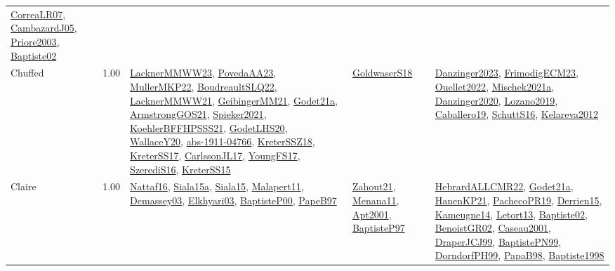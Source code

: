{\begin{longtable}{p{3cm}r>{\raggedright\arraybackslash}p{6cm}>{\raggedright\arraybackslash}p{6cm}>{\raggedright\arraybackslash}p{8cm}}
\hyperref[detail:CorreaLR07]{CorreaLR07}, \hyperref[detail:CambazardJ05]{CambazardJ05}, \hyperref[detail:Priore2003]{Priore2003}, \hyperref[detail:Baptiste02]{Baptiste02}\\
\index{Chuffed}\index{CPSystems!Chuffed}Chuffed &  1.00 & \hyperref[detail:LacknerMMWW23]{LacknerMMWW23}, \hyperref[detail:PovedaAA23]{PovedaAA23}, \hyperref[detail:MullerMKP22]{MullerMKP22}, \hyperref[detail:BoudreaultSLQ22]{BoudreaultSLQ22}, \hyperref[detail:LacknerMMWW21]{LacknerMMWW21}, \hyperref[detail:GeibingerMM21]{GeibingerMM21}, \hyperref[detail:Godet21a]{Godet21a}, \hyperref[detail:ArmstrongGOS21]{ArmstrongGOS21}, \hyperref[detail:Spieker2021]{Spieker2021}, \hyperref[detail:KoehlerBFFHPSSS21]{KoehlerBFFHPSSS21}, \hyperref[detail:GodetLHS20]{GodetLHS20}, \hyperref[detail:WallaceY20]{WallaceY20}, \hyperref[detail:abs-1911-04766]{abs-1911-04766}, \hyperref[detail:KreterSSZ18]{KreterSSZ18}, \hyperref[detail:KreterSS17]{KreterSS17}, \hyperref[detail:CarlssonJL17]{CarlssonJL17}, \hyperref[detail:YoungFS17]{YoungFS17}, \hyperref[detail:SzerediS16]{SzerediS16}, \hyperref[detail:KreterSS15]{KreterSS15} & \hyperref[detail:GoldwaserS18]{GoldwaserS18} & \hyperref[detail:Danzinger2023]{Danzinger2023}, \hyperref[detail:FrimodigECM23]{FrimodigECM23}, \hyperref[detail:Ouellet2022]{Ouellet2022}, \hyperref[detail:Mischek2021a]{Mischek2021a}, \hyperref[detail:Danzinger2020]{Danzinger2020}, \hyperref[detail:Lozano2019]{Lozano2019}, \hyperref[detail:Caballero19]{Caballero19}, \hyperref[detail:SchuttS16]{SchuttS16}, \hyperref[detail:Kelareva2012]{Kelareva2012}\\
\index{Claire}\index{CPSystems!Claire}Claire &  1.00 & \hyperref[detail:Nattaf16]{Nattaf16}, \hyperref[detail:Siala15a]{Siala15a}, \hyperref[detail:Siala15]{Siala15}, \hyperref[detail:Malapert11]{Malapert11}, \hyperref[detail:Demassey03]{Demassey03}, \hyperref[detail:Elkhyari03]{Elkhyari03}, \hyperref[detail:BaptisteP00]{BaptisteP00}, \hyperref[detail:PapeB97]{PapeB97} & \hyperref[detail:Zahout21]{Zahout21}, \hyperref[detail:Menana11]{Menana11}, \hyperref[detail:Apt2001]{Apt2001}, \hyperref[detail:BaptisteP97]{BaptisteP97} & \hyperref[detail:HebrardALLCMR22]{HebrardALLCMR22}, \hyperref[detail:Godet21a]{Godet21a}, \hyperref[detail:HanenKP21]{HanenKP21}, \hyperref[detail:PachecoPR19]{PachecoPR19}, \hyperref[detail:Derrien15]{Derrien15}, \hyperref[detail:Kameugne14]{Kameugne14}, \hyperref[detail:Letort13]{Letort13}, \hyperref[detail:Baptiste02]{Baptiste02}, \hyperref[detail:BenoistGR02]{BenoistGR02}, \hyperref[detail:Caseau2001]{Caseau2001}, \hyperref[detail:DraperJCJ99]{DraperJCJ99}, \hyperref[detail:BaptistePN99]{BaptistePN99}, \hyperref[detail:DorndorfPH99]{DorndorfPH99}, \hyperref[detail:PapaB98]{PapaB98}, \hyperref[detail:Baptiste1998]{Baptiste1998}\\

\end{longtable}}
